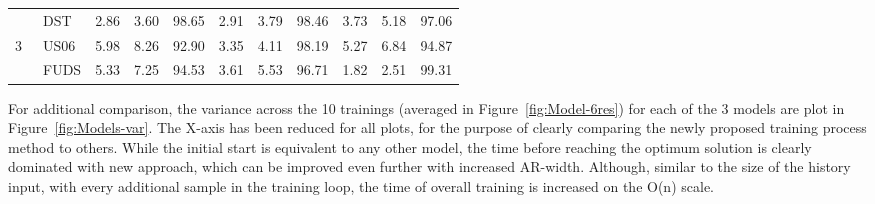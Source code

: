 {\begin{table*}[!ht]
{\begin{tabular}{ c l c c c c c c c c c}
    \hline
        & DST & 2.86 & 3.60 & 98.65 & 2.91 & 3.79 & 98.46 & 3.73 & 5.18 & 97.06 \\ 
    3~\cite{sadykov_practical_2022} & US06 & 5.98 & 8.26 & 92.90 & 3.35 & 4.11 & 98.19 & 5.27 & 6.84 & 94.87 \\ 
        & FUDS & 5.33 & 7.25 & 94.53 & 3.61 & 5.53 & 96.71 & 1.82 & 2.51 & 99.31 \\ 
    \hline\hline
\end{tabular}
}
\end{table*}
}

For additional comparison, the variance across the 10 trainings (averaged in Figure~\ref{fig:Model-6res}) for each of the 3 models are plot in Figure~\ref{fig:Models-var}.
The X-axis has been reduced for all plots, for the purpose of clearly comparing the newly proposed training process method to others.
While the initial start is equivalent to any other model, the time before reaching the optimum solution is clearly dominated with new approach, which can be improved even further with increased AR-width.
Although, similar to the size of the history input, with every additional sample in the training loop, the time of overall training is increased on the O(n) scale.
\begin{figure*}[!h]
    \centering
    \vspace{-3ex}
    \hfill
    \hfill
    \caption{Variance comparison plot visualisation, where Max and Min lines outline the limits of the best and worst case histories and average of 10 attempts being the overall performance.}
    \label{fig:Models-var}
\end{figure*}

